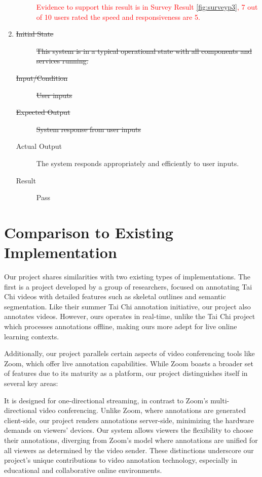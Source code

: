 \documentclass[12pt, titlepage]{article}
\newcommand{\rt}[1]{\textcolor{red}{#1}}
\begin{document}
\begin{enumerate}[NFR-T1]
\begin{description}
    \rt{ Evidence to support this result is in Survey Result \ref{fig:surveyp3}, 7 out of 10 users rated the speed and responsiveness are 5. }
    \end{description}
  \item \label{NFRT30}
    \begin{description}
    \item[\sout{Initial State}]\sout{ This system is in a typical operational state with all
      components and services running.
    }
		\item[\sout{Input/Condition}]\sout{ User inputs
    }
		\item[\sout{Expected Output}]\sout{ System response from user inputs
    }
		\item[Actual Output] The system responds appropriately and efficiently to user
      inputs.
    \item[Result] Pass
    \end{description}
  \end{enumerate}

\section{Comparison to Existing Implementation}

Our project shares similarities with two existing types of implementations. The
first is a project developed by a group of researchers, focused on annotating
Tai Chi videos with detailed features such as skeletal outlines and semantic
segmentation. Like their summer Tai Chi annotation initiative, our project also
annotates videos. However, ours operates in real-time, unlike the Tai Chi
project which processes annotations offline, making ours more adept for live
online learning contexts.

Additionally, our project parallels certain aspects of video conferencing tools
like Zoom, which offer live annotation capabilities. While Zoom boasts a broader
set of features due to its maturity as a platform, our project distinguishes
itself in several key areas:

It is designed for one-directional streaming, in contrast to Zoom's
multi-directional video conferencing. Unlike Zoom, where annotations are
generated client-side, our project renders annotations server-side, minimizing
the hardware demands on viewers' devices. Our system allows viewers the
flexibility to choose their annotations, diverging from Zoom's model where
annotations are unified for all viewers as determined by the video sender. These
distinctions underscore our project's unique contributions to video annotation
technology, especially in educational and collaborative online environments.
\end{document}
